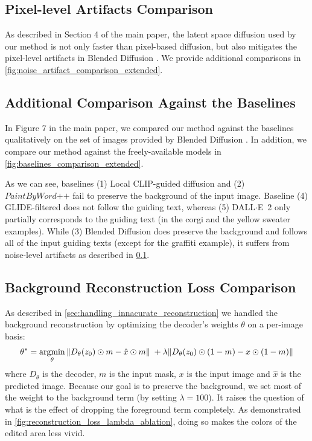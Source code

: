\begin{appendix}
\subsection{Pixel-level Artifacts Comparison}
\label{subsec:pixel-level-artifacts}
As described in Section 4 of the main paper, the latent space diffusion used by our method is not only faster than pixel-based diffusion, but also mitigates the pixel-level artifacts in Blended Diffusion \cite{avrahami2022blended}. We provide additional comparisons in \ref{fig:noise_artifact_comparison_extended}.

\subsection{Additional Comparison Against the Baselines} In Figure 7 in the main paper, we compared our method against the baselines qualitatively on the set of images provided by Blended Diffusion \cite{avrahami2022blended}. In addition, we compare our method against the freely-available models in \ref{fig:baselines_comparison_extended}. 

As we can see, baselines (1) Local CLIP-guided diffusion and (2) $\textit{PaintByWord++}$ fail to preserve the background of the input image. Baseline (4) GLIDE-filtered does not follow the guiding text, whereas (5) {DALL$\cdot$E}~2 only partially corresponds to the guiding text (in the corgi and the yellow sweater examples). While (3) Blended Diffusion does preserve the background and follows all of the input guiding texts (except for the graffiti example), it suffers from noise-level artifacts as described in 
\ref{subsec:pixel-level-artifacts}.

\subsection{Background Reconstruction Loss Comparison} As described in 
\ref{sec:handling_innacurate_reconstruction}
we handled the background reconstruction by optimizing the decoder's weights $\theta$ on a per-image basis:
\begin{equation}
    \label{eqn:weights_optimization_appdx}
    \theta^* = \operatornamewithlimits{argmin}\limits_{\theta} \| D_{\theta}(z_0) \odot m - \hat{x} \odot m \| \;+ \\ \lambda \| D_{\theta}(z_0) \odot (1 - m) - x \odot (1 - m) \|
\end{equation}
where $D_{\theta}$ is the decoder, $m$ is the input mask, $x$ is the input image and $\hat{x}$ is the predicted image. Because our goal is to preserve the background, we set most of the weight to the background term (by setting $\lambda = 100$). It raises the question of what is the effect of dropping the foreground term completely. As demonstrated in \ref{fig:reconstruction_loss_lambda_ablation}, doing so makes the colors of the edited area less vivid.


\end{appendix}
